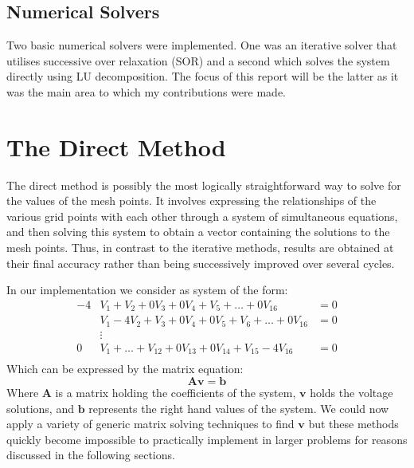 \documentclass[a4paper]{article}
\newcommand{\mat}[1]{\mathbf{#1}}
\newcommand{\vect}[1]{\bm{#1}}
\begin{document}
\subsection{Numerical Solvers}
Two basic numerical solvers were implemented. One was an iterative solver that
utilises successive over relaxation (SOR) and a second which solves the system
directly using LU decomposition. The focus of this report will be the latter as
it was the main area to which my contributions were made.

\section{The Direct Method}
The direct method is possibly the most logically straightforward way to solve
for the values of the mesh points. It involves expressing the relationships of
the various grid points with each other through a system of simultaneous
equations, and then solving this system to obtain a vector containing the
solutions to the mesh points. Thus, in contrast to the iterative methods,
results are obtained at their final accuracy rather than being successively
improved over several cycles.

In our implementation we consider as system of the form:
\begin{align*}
	-4&V_1+V_2+0V_3+0V_4+V_5+\dots+0V_{16}&=0\\
	&V_1-4V_2+V_3+0V_4+0V_5+V_6+\dots+0V_{16}&=0\\
	&\vdots\\
	0&V_1+\dots+V_{12}+0V_{13}+0V_{14}+V_{15}-4V_{16}&=0\\
\end{align*}
Which can be expressed by the matrix equation:
\begin{equation}
	\mat{A}\vect{v}=\vect{b}
	\label{matEq}
\end{equation}
Where $\mat{A}$ is a matrix holding the coefficients of the system, $\vect{v}$
holds the voltage solutions, and $\vect{b}$ represents the right hand values of
the system. We could now apply a variety of generic matrix solving techniques
to find $\vect{v}$ but these methods quickly become impossible to practically
implement in larger problems for reasons discussed in the following sections.
\end{document}
